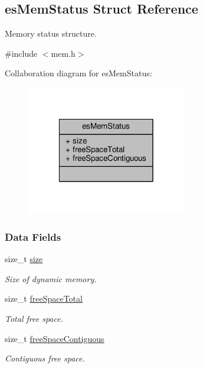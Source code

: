 \hypertarget{structesMemStatus}{\subsection{es\-Mem\-Status Struct Reference}
\label{structesMemStatus}
}


Memory status structure.  




{\ttfamily \#include $<$mem.\-h$>$}



Collaboration diagram for es\-Mem\-Status\-:\nopagebreak
\begin{figure}[H]
\begin{center}
\leavevmode
\includegraphics[width=198pt]{structesMemStatus__coll__graph}
\end{center}
\end{figure}
\subsubsection*{Data Fields}
\begin{DoxyCompactItemize}
\item 
size\-\_\-t \hyperlink{structesMemStatus_a380e3d7b616ea3b5b2116c643616f170}{size}
\begin{DoxyCompactList}\small\item\em Size of dynamic memory. \end{DoxyCompactList}\item 
size\-\_\-t \hyperlink{structesMemStatus_a7e03e413141601c2486fd55e8d4c6daf}{free\-Space\-Total}
\begin{DoxyCompactList}\small\item\em Total free space. \end{DoxyCompactList}\item 
size\-\_\-t \hyperlink{structesMemStatus_ab9abe5784bc4bb701ee759a2e02bfd8d}{free\-Space\-Contiguous}
\begin{DoxyCompactList}\small\item\em Contiguous free space. \end{DoxyCompactList}\end{DoxyCompactItemize}


